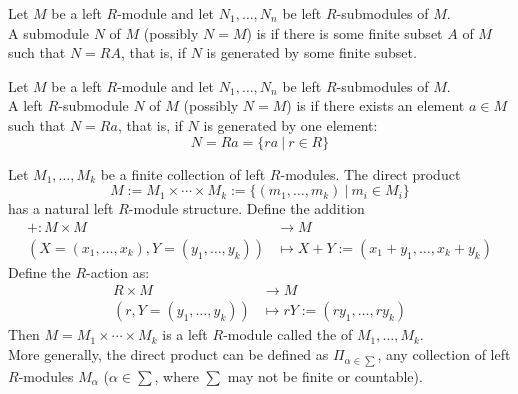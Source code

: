 \begin{definition}
Let $M$ be a left $R$-module and let $N_1, \ldots, N_n$ be left $R$-submodules of $M$.\\
A submodule $N$ of $M$ (possibly $N=M$) is  if there is some finite subset $A$ of $M$ such that $N=RA$, that is, if $N$ is generated by some finite subset.
\end{definition}

\begin{definition}
Let $M$ be a left $R$-module and let $N_1, \ldots, N_n$ be left $R$-submodules of $M$.\\
A left $R$-submodule $N$ of $M$ (possibly $N=M$) is  if there exists an element $a \in M$ such that $N = Ra$, that is, if $N$ is generated by one element:
\begin{equation}
N = Ra = \{ra \ | \ r \in R\} \nonumber
\end{equation}
\end{definition}

\begin{definition}
\label{def:directprod}
Let $M_1, \ldots, M_k$ be a finite collection of left $R$-modules. The direct product
\begin{equation}
M := M_1 \times \cdots \times M_k := \{(m_1, \ldots, m_k) \ | \ m_i \in M_i\} \nonumber
\end{equation}	
has a natural left $R$-module structure. Define the addition
\begin{align}
+ : M \times M &\rightarrow M \nonumber \\
(X = (x_1, \ldots, x_k), Y = (y_1, \ldots, y_k)) &\mapsto X + Y := (x_1 + y_1, \ldots, x_k + y_k) \nonumber
\end{align}
Define the $R$-action as:
\begin{align}
R \times M &\rightarrow M \nonumber \\
(r, Y=(y_1, \ldots, y_k)) &\mapsto rY := (ry_1, \ldots, ry_k) \nonumber
\end{align}
Then $M = M_1 \times \cdots \times M_k$ is a left $R$-module called the  of $M_1, \ldots, M_k$. \\
More generally, the direct product can be defined as $\Pi_{\alpha \in \sum}$, any collection of left $R$-modules $M_{\alpha}$ ($\alpha \in \sum$, where $\sum$ may not be finite or countable).
\end{definition}


